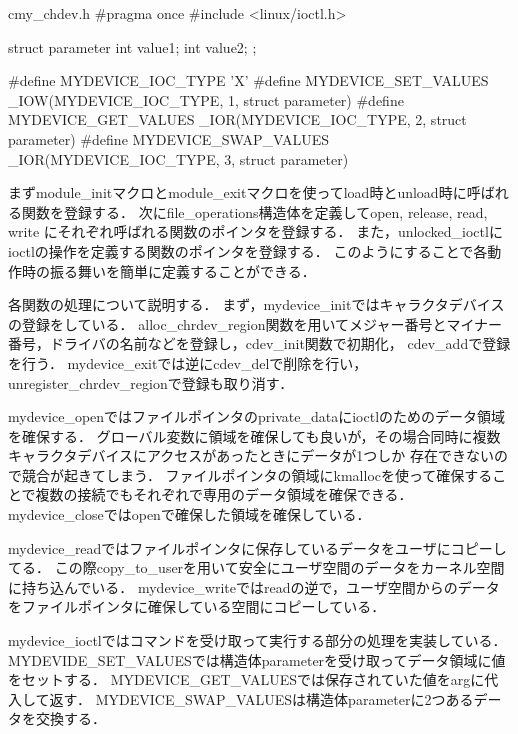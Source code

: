 \begin{longlisting}
\begin{myminted}{c}{my_chdev.h}
#pragma once
#include <linux/ioctl.h>

struct parameter {
    int value1;
    int value2;
};

#define MYDEVICE_IOC_TYPE 'X'
#define MYDEVICE_SET_VALUES _IOW(MYDEVICE_IOC_TYPE, 1, struct parameter)
#define MYDEVICE_GET_VALUES _IOR(MYDEVICE_IOC_TYPE, 2, struct parameter)
#define MYDEVICE_SWAP_VALUES _IOR(MYDEVICE_IOC_TYPE, 3, struct parameter)
\end{myminted}
\caption{my_chdev.h}
\label{lst:chdevh}
\end{longlisting}

まずmodule_initマクロとmodule_exitマクロを使ってload時とunload時に呼ばれる関数を登録する．
次にfile_operations構造体を定義してopen, release, read, write にそれぞれ呼ばれる関数のポインタを登録する．
また，unlocked_ioctlにioctlの操作を定義する関数のポインタを登録する．
このようにすることで各動作時の振る舞いを簡単に定義することができる．

各関数の処理について説明する．
まず，mydevice_initではキャラクタデバイスの登録をしている．
alloc_chrdev_region関数を用いてメジャー番号とマイナー番号，ドライバの名前などを登録し，cdev_init関数で初期化，
cdev_addで登録を行う．
mydevice_exitでは逆にcdev_delで削除を行い，unregister_chrdev_regionで登録も取り消す．

mydevice_openではファイルポインタのprivate_dataにioctlのためのデータ領域を確保する．
グローバル変数に領域を確保しても良いが，その場合同時に複数キャラクタデバイスにアクセスがあったときにデータが1つしか
存在できないので競合が起きてしまう．
ファイルポインタの領域にkmallocを使って確保することで複数の接続でもそれぞれで専用のデータ領域を確保できる．
mydevice_closeではopenで確保した領域を確保している．

mydevice_readではファイルポインタに保存しているデータをユーザにコピーしてる．
この際copy_to_userを用いて安全にユーザ空間のデータをカーネル空間に持ち込んでいる．
mydevice_writeではreadの逆で，ユーザ空間からのデータをファイルポインタに確保している空間にコピーしている．

mydevice_ioctlではコマンドを受け取って実行する部分の処理を実装している．
MYDEVIDE_SET_VALUESでは構造体parameterを受け取ってデータ領域に値をセットする．
MYDEVICE_GET_VALUESでは保存されていた値をargに代入して返す．
MYDEVICE_SWAP_VALUESは構造体parameterに2つあるデータを交換する．

